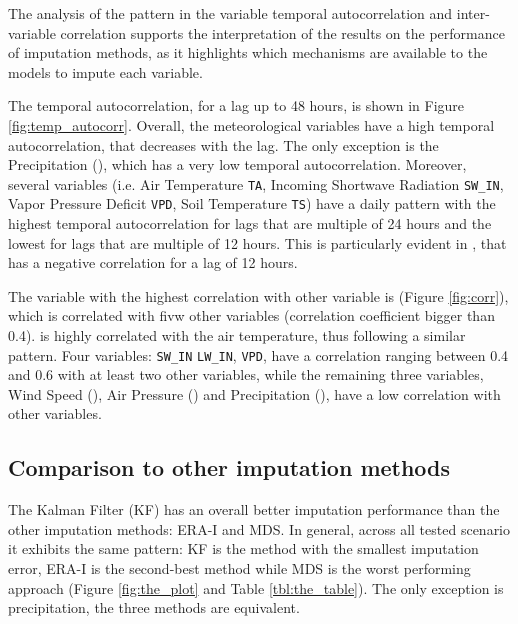 \documentclass{article}
\let\Oldsubsection\subsection
\renewcommand{\subsection}{\FloatBarrier\Oldsubsection}
\begin{document}
The analysis of the pattern in the variable temporal autocorrelation and inter-variable correlation supports the interpretation of the results on the performance of imputation methods, as it highlights which mechanisms are available to the models to impute each variable.

The temporal autocorrelation, for a lag up to 48 hours, is shown in Figure \ref{fig:temp_autocorr}. Overall, the meteorological variables have a high temporal autocorrelation, that decreases with the lag. The only exception is the Precipitation (), which has a very low temporal autocorrelation. Moreover, several variables (i.e. Air Temperature \texttt{TA}, Incoming Shortwave Radiation \texttt{SW\_IN},  Vapor Pressure Deficit \texttt{VPD}, Soil Temperature \texttt{TS}) have a daily pattern with the highest temporal autocorrelation for lags that are multiple of 24 hours and the lowest for lags that are multiple of 12 hours. This is particularly evident in , that has a negative correlation for a lag of 12 hours.

The variable with the highest correlation with other variable is  (Figure \ref{fig:corr}), which is correlated with fivw other variables (correlation coefficient bigger than 0.4).  is highly correlated with the air temperature, thus following a similar pattern. Four variables: \texttt{SW\_IN} \texttt{LW\_IN}, \texttt{VPD},  have a correlation ranging between 0.4 and 0.6 with at least two other variables, while the remaining three variables, Wind Speed (), Air Pressure () and Precipitation (), have a low correlation with other variables.  


\subsection{Comparison to other imputation methods}

The Kalman Filter (KF) has an overall better imputation performance than the other imputation methods: ERA-I and MDS. In general, across all tested scenario it exhibits the same pattern: KF is the method with the smallest imputation error, ERA-I is the second-best method while MDS is the worst performing approach (Figure \ref{fig:the_plot} and Table \ref{tbl:the_table}). The only exception is precipitation, the three methods are equivalent.
\end{document}
